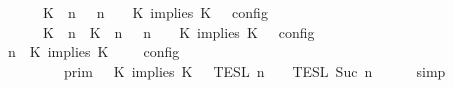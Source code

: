 \begin{isabellebody}
\ \ \ \ \ \ {\isacharequal}\ {\isasymlbrakk}\ {\isacharparenleft}{\isacharparenleft}K\ {\isasymnot}{\isasymUp}\ n{\isacharparenright}\ {\isacharhash}\ {\isasymGamma}{\isacharparenright}{\isacharcomma}\ n\ {\isasymturnstile}\ {\isasymPsi}\ {\isasymtriangleright}\ {\isacharparenleft}{\isacharparenleft}K\ implies\ K\ {\isacharhash}\ {\isasymPhi}{\isacharparenright}\ {\isasymrbrakk}\isactrlsub c\isactrlsub o\isactrlsub n\isactrlsub f\isactrlsub i\isactrlsub g\isanewline
\ \ \ \ \ \ {\isasymunion}\ {\isasymlbrakk}\ {\isacharparenleft}{\isacharparenleft}K\ {\isasymUp}\ n{\isacharparenright}\ {\isacharhash}\ {\isacharparenleft}K\ {\isasymUp}\ n{\isacharparenright}\ {\isacharhash}\ {\isasymGamma}{\isacharparenright}{\isacharcomma}\ n\ {\isasymturnstile}\ {\isasymPsi}\ {\isasymtriangleright}\ {\isacharparenleft}{\isacharparenleft}K\ implies\ K\ {\isacharhash}\ {\isasymPhi}{\isacharparenright}\ {\isasymrbrakk}\isactrlsub c\isactrlsub o\isactrlsub n\isactrlsub f\isactrlsub i\isactrlsub g{\isacartoucheclose}\isanewline
%
\isadelimproof
%
\endisadelimproof
%
\isatagproof
{}\isamarkupfalse%
\ {\isacharminus}\isanewline
\ \ \isamarkupfalse%
\ {\isacartoucheopen}{\isasymlbrakk}\ {\isasymGamma}{\isacharcomma}\ n\ {\isasymturnstile}\ {\isacharparenleft}K\ implies\ K\ {\isacharhash}\ {\isasymPsi}\ {\isasymtriangleright}\ {\isasymPhi}\ {\isasymrbrakk}\isactrlsub c\isactrlsub o\isactrlsub n\isactrlsub f\isactrlsub i\isactrlsub g\isanewline
\ \ \ \ \ \ \ \ {\isacharequal}\ {\isasymlbrakk}{\isasymlbrakk}\ {\isasymGamma}\ {\isasymrbrakk}{\isasymrbrakk}\isactrlsub p\isactrlsub r\isactrlsub i\isactrlsub m\ {\isasyminter}\ {\isasymlbrakk}{\isasymlbrakk}\ {\isacharparenleft}K\ implies\ K\ {\isacharhash}\ {\isasymPsi}\ {\isasymrbrakk}{\isasymrbrakk}\isactrlsub T\isactrlsub E\isactrlsub S\isactrlsub L\isactrlbsup {\isasymge}\ n\isactrlesup \ {\isasyminter}\ {\isasymlbrakk}{\isasymlbrakk}\ {\isasymPhi}\ {\isasymrbrakk}{\isasymrbrakk}\isactrlsub T\isactrlsub E\isactrlsub S\isactrlsub L\isactrlbsup {\isasymge}\ Suc\ n\isactrlesup {\isacartoucheclose}\isanewline
\ \ \ \ \isamarkupfalse%
\ simp\isanewline
\ \ \isamarkupfalse%
\ \isamarkupfalse%

\end{isabellebody}
